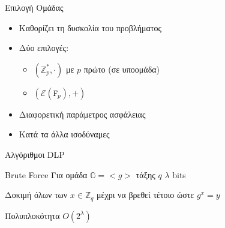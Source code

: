 \documentclass[handout]{beamer}
\begin{document}
\begin{frame}{Επιλογή Ομάδας}
\begin{itemize}
    \item Καθορίζει τη δυσκολία του προβλήματος 
    \item Δύο επιλογές:
    \begin{itemize}
        \item $(\mathbb{Z}_p^*, \cdot)$ με $p$ πρώτο (σε υποομάδα)
        \item $(\mathcal{E}(\mathtt{F}_p),+)$
    \end{itemize}
    \item Διαφορετική παράμετρος ασφάλειας
    \item Κατά τα άλλα ισοδύναμες
\end{itemize}
\end{frame}



\begin{frame}{Αλγόριθμοι DLP}
\begin{block}{Brute Force}
Για ομάδα $\mathbb{G}=<g>$ τάξης $q$ $\lambda$ bits
\medskip

Δοκιμή όλων των $x \in \mathbb{Z}_q$ μέχρι να βρεθεί τέτοιο ώστε $g^x = y$
\medskip

Πολυπλοκότητα $O(2^\lambda)$
\end{block}
\end{frame}

%
%
%
%
\end{document}
